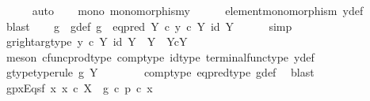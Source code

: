 \begin{isabellebody}
\ \ \ \ \isamarkupfalse%
\ auto\isanewline
\ \ \isamarkupfalse%
\ mono{\isacharcolon}{\kern0pt}\ {\isachardoublequoteopen}monomorphism{\isacharparenleft}{\kern0pt}y{}{\isacharparenright}{\kern0pt}{\isachardoublequoteclose}\isanewline
\ \ \ \ \isamarkupfalse%
\ element{\isacharunderscore}{\kern0pt}monomorphism\ y{\isacharunderscore}{\kern0pt}def\ \isamarkupfalse%
\ blast\isanewline
\ \ \isamarkupfalse%
\ g\ \ g{\isacharunderscore}{\kern0pt}def{\isacharcolon}{\kern0pt}\ {\isachardoublequoteopen}g\ {\isacharequal}{\kern0pt}\ eq{\isacharunderscore}{\kern0pt}pred\ Y\ {\isasymcirc}\isactrlsub c\ {\isasymlangle}y{}\ {\isasymcirc}\isactrlsub c\ {\isasymbeta}\isactrlbsub Y\isactrlesub {\isacharcomma}{\kern0pt}\ id\ Y{\isasymrangle}{\isachardoublequoteclose}\isanewline
\ \ \ \ \isamarkupfalse%
\ simp\isanewline
\ \ \isamarkupfalse%
\ g{\isacharunderscore}{\kern0pt}right{\isacharunderscore}{\kern0pt}arg{\isacharunderscore}{\kern0pt}type{\isacharcolon}{\kern0pt}\ {\isachardoublequoteopen}{\isasymlangle}y{}\ {\isasymcirc}\isactrlsub c\ {\isasymbeta}\isactrlbsub Y\isactrlesub {\isacharcomma}{\kern0pt}\ id\ Y{\isasymrangle}\ {\isacharcolon}{\kern0pt}\ Y\ {\isasymrightarrow}\ {\isacharparenleft}{\kern0pt}Y{\isasymtimes}\isactrlsub cY{\isacharparenright}{\kern0pt}{\isachardoublequoteclose}\isanewline
\ \ \ \ \isamarkupfalse%
\ {\isacharparenleft}{\kern0pt}meson\ cfunc{\isacharunderscore}{\kern0pt}prod{\isacharunderscore}{\kern0pt}type\ comp{\isacharunderscore}{\kern0pt}type\ id{\isacharunderscore}{\kern0pt}type\ terminal{\isacharunderscore}{\kern0pt}func{\isacharunderscore}{\kern0pt}type\ y{\isacharunderscore}{\kern0pt}def{\isacharparenright}{\kern0pt}\isanewline
\ \ \isamarkupfalse%
\ \isamarkupfalse%
\ g{\isacharunderscore}{\kern0pt}type{\isacharbrackleft}{\kern0pt}type{\isacharunderscore}{\kern0pt}rule{\isacharbrackright}{\kern0pt}{\isacharcolon}{\kern0pt}\ {\isachardoublequoteopen}g{\isacharcolon}{\kern0pt}\ Y\ {\isasymrightarrow}\ {\isasymOmega}{\isachardoublequoteclose}\isanewline
\ \ \ \ \isamarkupfalse%
\ comp{\isacharunderscore}{\kern0pt}type\ eq{\isacharunderscore}{\kern0pt}pred{\isacharunderscore}{\kern0pt}type\ g{\isacharunderscore}{\kern0pt}def\ \isamarkupfalse%
\ blast\isanewline
\isanewline
\ \ \isamarkupfalse%
\ gpx{\isacharunderscore}{\kern0pt}Eqs{\isacharunderscore}{\kern0pt}f{\isacharcolon}{\kern0pt}\ {\isachardoublequoteopen}{\isasymforall}x{\isachardot}{\kern0pt}\ {\isacharparenleft}{\kern0pt}x\ {\isasymin}\isactrlsub c\ X\ {\isasymlongrightarrow}\ g\ {\isasymcirc}\isactrlsub c\ p\ {\isasymcirc}\isactrlsub c\ x\ {\isacharequal}{\kern0pt}\ {\isasymf}{\isacharparenright}{\kern0pt}{\isachardoublequoteclose}\isanewline

\end{isabellebody}

